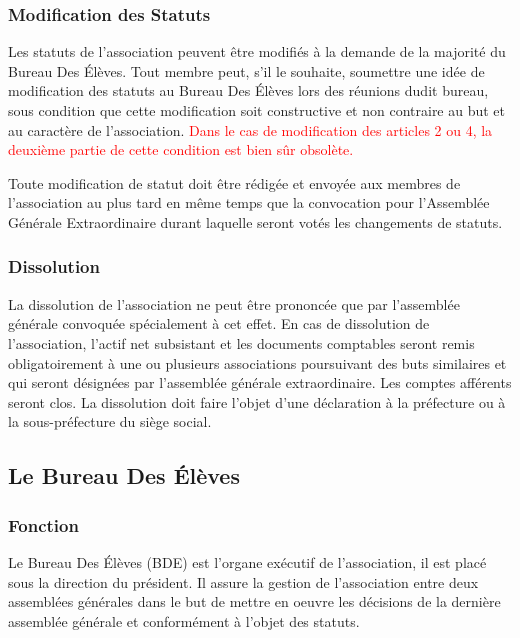\documentclass{article} %
\begin{document}
			\subsubsection{Modification des Statuts}
				Les statuts de l’association peuvent être modifiés à la demande de la majorité du Bureau Des Élèves. Tout membre peut, s’il le souhaite,
				soumettre une idée de modification des statuts au Bureau Des Élèves lors des réunions dudit bureau, sous condition que cette modification
				soit constructive et non contraire au but et au caractère de l’association. \textcolor{red}{Dans le cas de modification des articles 2 ou 4,
				la deuxième partie de cette condition est bien sûr obsolète.}

				Toute modification de statut doit être rédigée et envoyée aux membres de l’association au plus tard en même temps que la convocation pour
				l’Assemblée Générale Extraordinaire durant laquelle seront votés les changements de statuts.

			\subsubsection{Dissolution}
				La dissolution de l’association ne peut être prononcée que par l’assemblée générale convoquée spécialement à cet effet.
				En cas de dissolution de l’association, l’actif net subsistant et les documents comptables seront remis obligatoirement à une ou plusieurs
				associations poursuivant des buts similaires et qui seront désignées par l’assemblée générale extraordinaire. Les comptes afférents seront clos.
				La dissolution doit faire l’objet d’une déclaration à la préfecture ou à la sous-préfecture du siège social.

		\subsection{Le Bureau Des Élèves}
			\subsubsection{Fonction}
				Le Bureau Des Élèves (BDE) est l'organe exécutif de l'association, il est placé sous la direction du président.
				Il assure la gestion de l'association entre deux assemblées générales dans le but de mettre en oeuvre les décisions
				de la dernière assemblée générale et conformément à l'objet des statuts.
\end{document}
